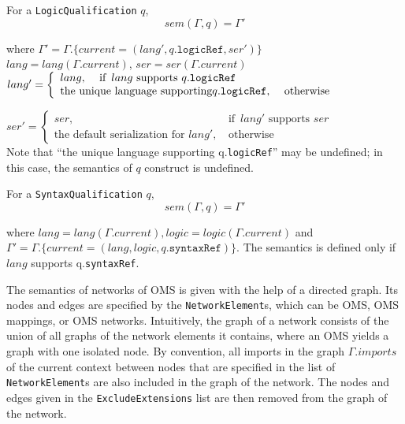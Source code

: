 \documentclass[10pt, a4paper]{isov2}
\newcommand*{\syntax}[1]{\texttt{#1}}
\newcommand{\mBox}[1]{\, \mbox{#1} \,}
\newcommand{\twocase}[3]{
\left\{
\begin{array}{ll}
  #1,&\mBox{if }#2\\
  #3,&\mBox{otherwise}
\end{array}\right.}
\newcommand{\current}{\mathit{current}}
\begin{document}
%

For a \syntax{LogicQualification} $q$,
 $$sem(\Gamma,q)=\Gamma'$$

 \noindent where
 $\Gamma' = \Gamma.\{\current = (lang',q.\syntax{logicRef},ser')\}$\\
$lang = lang(\Gamma.\current)$, $ser=ser(\Gamma.\current)$\\


$lang'=
{
\left\{
\begin{array}{l}
{lang},\mBox{\quad if }	{lang \textrm{ supports } q.\syntax{logicRef}} \\
  	{\textrm{the unique language supporting}q.\syntax{logicRef}},\mBox{\quad otherwise}
\end{array}\right.}
$

%


$ser' = \twocase{ser}{lang' \textrm{ supports }
   ser} {\textrm{the default serialization for
   }lang'}$
 \\
 Note that ``the unique language supporting q.\syntax{logicRef}'' may
 be undefined; in this case, the semantics of $q$
 construct is undefined.

For a \syntax{SyntaxQualification} $q$,
$$sem(\Gamma,q)=\Gamma'$$

\noindent where $lang = lang(\Gamma.\current), logic = logic(\Gamma.\current)$ and\\
$\Gamma'  = \Gamma.\{\current = (lang, logic, q.\syntax{syntaxRef})\}$.
The semantics is defined only if $\mathit{lang}$ supports q.\syntax{syntaxRef}.




The semantics of networks of OMS is given with the help of a directed graph. Its nodes
and edges are specified by the \syntax{NetworkElement}s, which can be OMS, OMS mappings, or OMS networks. Intuitively, the graph of a
network consists of the union of all graphs of the network elements it
contains, where an OMS yields a graph with one isolated node. By convention,
all imports in the graph $\Gamma.imports$ of the current context between nodes that are
specified in the list of \syntax{NetworkElement}s are also included in the graph of
the network.
The nodes and edges given in the \syntax{ExcludeExtensions} list are then removed from the graph of the network.
\end{document}
